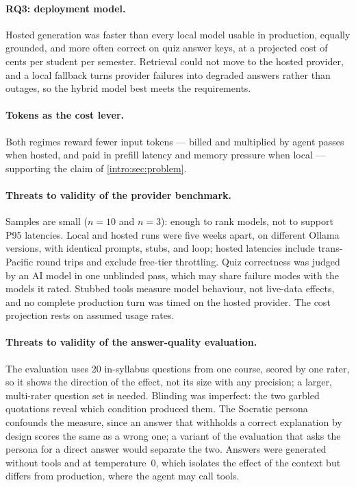 \paragraph{RQ3: deployment model.} Hosted generation was faster than every
local model usable in production, equally grounded, and more often correct
on quiz answer keys, at a projected cost of cents per student per semester.
Retrieval could not move to the hosted provider, and a local fallback turns
provider failures into degraded answers rather than outages, so the hybrid
model best meets the requirements.

\paragraph{Tokens as the cost lever.} Both regimes reward fewer input tokens
--- billed and multiplied by agent passes when hosted, and paid in prefill
latency and memory pressure when local --- supporting the claim of
\autoref{intro:sec:problem}.

\paragraph{Threats to validity of the provider benchmark.}
Samples are small ($n=10$ and $n=3$): enough to rank models, not to support
P95 latencies. Local and hosted runs were five weeks apart, on different
Ollama versions, with identical prompts, stubs, and loop; hosted latencies
include trans-Pacific round trips and exclude free-tier throttling. Quiz
correctness was judged by an AI model in one unblinded pass, which may share
failure modes with the models it rated. Stubbed tools measure model
behaviour, not live-data effects, and no complete production turn was timed
on the hosted provider. The cost projection rests on assumed usage rates.

\paragraph{Threats to validity of the answer-quality evaluation.}
The evaluation uses 20 in-syllabus questions from one course, scored by one
rater, so it shows the direction of the effect, not its size with any
precision; a larger, multi-rater question set is needed. Blinding was
imperfect: the two garbled quotations reveal which condition produced them.
The Socratic persona confounds the measure, since an answer that withholds a
correct explanation by design scores the same as a wrong one; a variant of
the evaluation that asks the persona for a direct answer would separate the
two. Answers were generated without tools and at temperature~0, which
isolates the effect of the context but differs from production, where the
agent may call tools.

